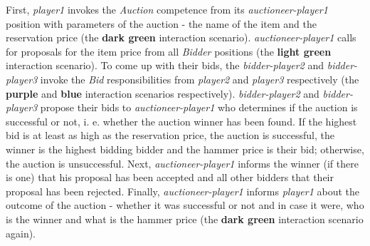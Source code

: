 First, \textit{player1} invokes the \textit{Auction} competence from its \textit{auctioneer-player1} position with parameters of the auction - the name of the item and the reservation price (the \textbf{dark green} interaction scenario).
\textit{auctioneer-player1} calls for proposals for the item price from all \textit{Bidder} positions (the \textbf{light green} interaction scenario).
To come up with their bids, the \textit{bidder-player2} and \textit{bidder-player3} invoke the \textit{Bid} responsibilities from \textit{player2} and \textit{player3} respectively (the \textbf{purple} and \textbf{blue} interaction scenarios respectively).
\textit{bidder-player2} and \textit{bidder-player3} propose their bids to \textit{auctioneer-player1} who determines if the auction is successful or not, i. e. whether the auction winner has been found.
If the highest bid is at least as high as the reservation price, the auction is successful, the winner is the highest bidding bidder and the hammer price is their bid; otherwise, the auction is unsuccessful.
Next, \textit{auctioneer-player1} informs the winner (if there is one) that his proposal has been accepted and all other bidders that their proposal has been rejected.
Finally, \textit{auctioneer-player1} informs \textit{player1} about the outcome of the auction - whether it was successful or not and in case it were, who is the winner and what is the hammer price (the \textbf{dark green} interaction scenario again).